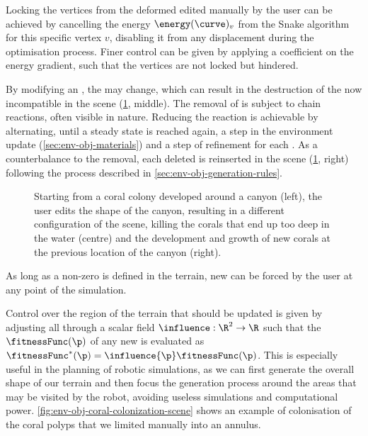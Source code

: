 Locking the vertices from the deformed  edited manually by the user can be achieved by cancelling the energy $\energy(\curve)_v$ from the Snake algorithm for this specific vertex $v$, disabling it from any displacement during the optimisation process. Finer control can be given by applying a coefficient on the energy gradient, such that the vertices are not locked but hindered.

By modifying an , the  may change, which can result in the destruction of the now incompatible  in the scene (\cref{fig:env-obj-user-interaction}, middle). The removal of  is subject to chain reactions, often visible in nature. Reducing the reaction is achievable by alternating, until a steady state is reached again, a step in the environment update (\cref{sec:env-obj-materials}) and a step of  refinement for each . As a counterbalance to the removal, each deleted  is reinserted in the scene (\cref{fig:env-obj-user-interaction}, right) following the process described in \cref{sec:env-obj-generation-rules}.

\begin{figure}
    \caption{Starting from a coral colony developed around a canyon (left), the user edits the shape of the canyon, resulting in a different configuration of the scene, killing the corals that end up too deep in the water (centre) and the development and growth of new corals at the previous location of the canyon (right).}
    \label{fig:env-obj-user-interaction}
\end{figure}

As long as a non-zero  is defined in the terrain, new  can be forced by the user at any point of the simulation.

Control over the region of the terrain that should be updated is given by adjusting all  through a scalar field $\influence: \R^2 \to \R $ such that the  $\fitnessFunc(\p)$ of any new  is evaluated as $\fitnessFunc^*(\p) = \influence{\p} \fitnessFunc(\p)$. This is especially useful in the planning of robotic simulations, as we can first generate the overall shape of our terrain and then focus the generation process around the areas that may be visited by the robot, avoiding useless simulations and computational power.
\cref{fig:env-obj-coral-colonization-scene} shows an example of colonisation of the coral polyps that we limited manually into an annulus.

